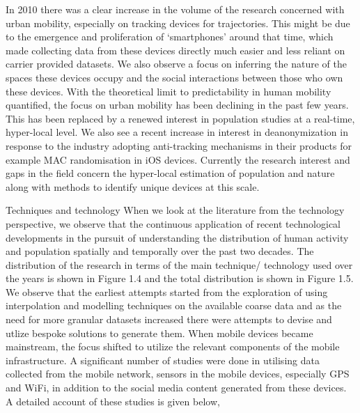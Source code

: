 In 2010 there was a clear increase in the volume of the research concerned with urban mobility, especially on tracking devices for trajectories. This might be due to the emergence and proliferation of ‘smartphones’ around that time, which made collecting data from these devices directly much easier and less reliant on carrier provided datasets. We also observe a focus on inferring the nature of the spaces these devices occupy and the social interactions between those who own these devices. With the theoretical limit to predictability in human mobility quantified, the focus on urban mobility has been declining in the past few years. This has been replaced by a renewed interest in population studies at a real-time, hyper-local level. We also see a recent increase in interest in deanonymization in response to the industry adopting anti-tracking mechanisms in their products for example MAC randomisation in iOS devices. Currently the research interest and gaps in the field concern the hyper-local estimation of population and nature along with methods to identify unique devices at this scale.

Techniques and technology
When we look at the literature from the technology perspective, we observe that the continuous application of recent technological developments in the pursuit of understanding the distribution of human activity and population spatially and temporally over the past two decades. The distribution of the research in terms of the main technique/ technology used over the years is shown in Figure 1.4 and the total distribution is shown in Figure 1.5. We observe that the earliest attempts started from the exploration of using interpolation and modelling techniques on the available coarse data and as the need for more granular datasets increased there were attempts to devise and utlize bespoke solutions to generate them. When mobile devices became mainstream, the focus shifted to utilize the relevant components of the mobile infrastructure. A significant number of studies were done in utilising data collected from the mobile network, sensors in the mobile devices, especially GPS and WiFi, in addition to the social media content generated from these devices. A detailed account of these studies is given below,

